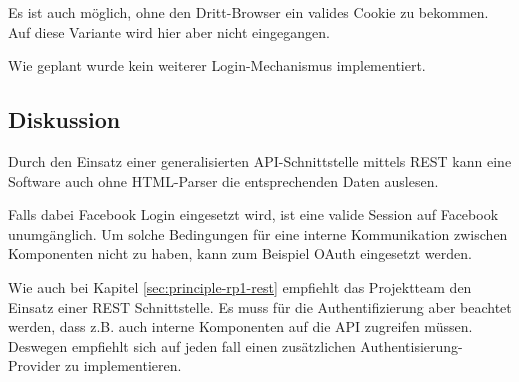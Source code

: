 Es ist auch möglich, ohne den Dritt-Browser ein valides Cookie zu bekommen. Auf diese Variante wird hier aber nicht eingegangen.

Wie geplant wurde kein weiterer Login-Mechanismus implementiert.

\subsection*{Diskussion}
Durch den Einsatz einer generalisierten API-Schnittstelle mittels REST kann eine Software auch ohne HTML-Parser die entsprechenden Daten auslesen.

Falls dabei Facebook Login eingesetzt wird, ist eine valide Session auf Facebook unumgänglich. Um solche Bedingungen für eine interne Kommunikation zwischen Komponenten nicht zu haben, kann zum Beispiel OAuth \cite{oauth} eingesetzt werden.

Wie auch bei Kapitel \ref{sec:principle-rp1-rest} empfiehlt das Projektteam den Einsatz einer REST Schnittstelle. Es muss für die Authentifizierung aber beachtet werden, dass z.B. auch interne Komponenten auf die API zugreifen müssen. Deswegen empfiehlt sich auf jeden fall einen zusätzlichen Authentisierung-Provider zu implementieren.